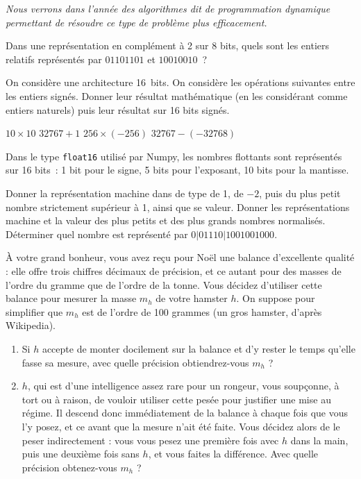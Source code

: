 \documentclass{magnoliaold}
\begin{document}
\emph{Nous verrons dans l'année des algorithmes dit de \og programmation dynamique \fg
permettant de résoudre ce type de problème plus efficacement.}


Dans une représentation en complément à 2 sur 8 bits, quels sont les entiers relatifs
représentés par $01101101$ et $10010010$~?

On considère une architecture 16~bits. On considère les opérations
suivantes entre les entiers signés. Donner leur résultat mathématique
(en les considérant comme entiers naturels) puis leur résultat sur
16 bits signés.
\begin{questions}
\question $10\times 10$
\question $32767+1$
\question $256 \times (-256)$
\question $32767 - (-32768)$
\end{questions}


Dans le type \verb!float16! utilisé par Numpy, les nombres flottants sont représentés
sur 16 bits~: 1 bit pour le signe, 5 bits pour l'exposant, 10 bits pour la mantisse.
\begin{questions}
\question Donner la représentation machine dans de type de 1, de $-2$, puis du plus petit
  nombre strictement supérieur à 1, ainsi que se valeur.
\question Donner les représentations machine et la valeur des plus petits et des plus grands
  nombres normalisés.
\question Déterminer quel nombre est représenté par $0|01110|1001001000$.
\end{questions}


  À votre grand bonheur, vous avez reçu pour Noël une balance d'excellente
  qualité : elle offre trois chiffres décimaux de précision, et ce autant
  pour des masses de l'ordre du gramme que de l'ordre de la tonne. Vous
  décidez d'utiliser cette balance pour mesurer la masse $m_h$ de votre
  hamster $h$. On suppose pour simplifier que $m_h$ est de l'ordre de
  100 grammes (un gros hamster, d'après Wikipedia).
  \begin{enumerate}
    \item Si $h$ accepte de monter docilement sur la balance et d'y rester
    le temps qu'elle fasse sa mesure, avec quelle précision obtiendrez-vous
    $m_h$ ?
    \item $h$, qui est d'une intelligence assez rare pour un rongeur,
    vous soupçonne, à tort ou à raison, de vouloir utiliser cette pesée pour
    justifier une mise au régime. Il descend donc immédiatement de la balance
    à chaque fois que vous l'y posez, et ce avant que la mesure n'ait été
    faite. Vous décidez alors de le peser indirectement : vous vous pesez une
    première fois avec $h$ dans la main, puis une deuxième fois sans $h$,
    et vous faites la différence. Avec quelle précision obtenez-vous $m_h$ ?
  \end{enumerate}
\end{document}
